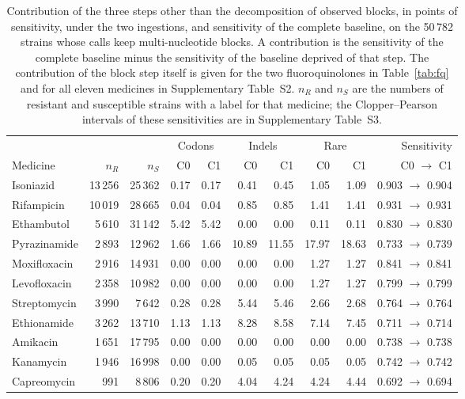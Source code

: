 \documentclass[11pt]{article}
\begin{document}
\begin{table}[t]
\centering
\caption{Contribution of the three steps other than the decomposition of observed blocks, in
points of sensitivity, under the two ingestions, and sensitivity of the complete baseline, on
the 50\,782 strains whose calls keep multi-nucleotide blocks. A contribution is the
sensitivity of the complete baseline minus the sensitivity of the baseline deprived of that
step. The contribution of the block step itself is given for the two fluoroquinolones in
Table~\ref{tab:fq} and for all eleven medicines in Supplementary Table~S2. $n_R$ and $n_S$
are the numbers of resistant and susceptible strains with a label for that medicine; the
Clopper--Pearson intervals of these sensitivities are in Supplementary Table~S3.}
\label{tab:medicaments}
\small
\begin{tabular}{lrrrrrrrrr}
\toprule
 & & & \multicolumn{2}{c}{Codons} & \multicolumn{2}{c}{Indels} &
\multicolumn{2}{c}{Rare} & Sensitivity \\
Medicine & $n_R$ & $n_S$ & C0 & C1 & C0 & C1 & C0 & C1 & C0 $\rightarrow$ C1 \\
\midrule
Isoniazid & 13\,256 & 25\,362 & 0.17 & 0.17 & 0.41 & 0.45 & 1.05 & 1.09 & 0.903 $\rightarrow$ 0.904 \\
Rifampicin & 10\,019 & 28\,665 & 0.04 & 0.04 & 0.85 & 0.85 & 1.41 & 1.41 & 0.931 $\rightarrow$ 0.931 \\
Ethambutol & 5\,610 & 31\,142 & 5.42 & 5.42 & 0.00 & 0.00 & 0.11 & 0.11 & 0.830 $\rightarrow$ 0.830 \\
Pyrazinamide & 2\,893 & 12\,962 & 1.66 & 1.66 & 10.89 & 11.55 & 17.97 & 18.63 & 0.733 $\rightarrow$ 0.739 \\
Moxifloxacin & 2\,916 & 14\,931 & 0.00 & 0.00 & 0.00 & 0.00 & 1.27 & 1.27 & 0.841 $\rightarrow$ 0.841 \\
Levofloxacin & 2\,358 & 10\,982 & 0.00 & 0.00 & 0.00 & 0.00 & 1.27 & 1.27 & 0.799 $\rightarrow$ 0.799 \\
Streptomycin & 3\,990 & 7\,642 & 0.28 & 0.28 & 5.44 & 5.46 & 2.66 & 2.68 & 0.764 $\rightarrow$ 0.764 \\
Ethionamide & 3\,262 & 13\,710 & 1.13 & 1.13 & 8.28 & 8.58 & 7.14 & 7.45 & 0.711 $\rightarrow$ 0.714 \\
Amikacin & 1\,651 & 17\,795 & 0.00 & 0.00 & 0.00 & 0.00 & 0.00 & 0.00 & 0.738 $\rightarrow$ 0.738 \\
Kanamycin & 1\,946 & 16\,998 & 0.00 & 0.00 & 0.05 & 0.05 & 0.05 & 0.05 & 0.742 $\rightarrow$ 0.742 \\
Capreomycin & 991 & 8\,806 & 0.20 & 0.20 & 4.04 & 4.24 & 4.24 & 4.44 & 0.692 $\rightarrow$ 0.694 \\
\bottomrule
\end{tabular}
\end{table}
\end{document}
